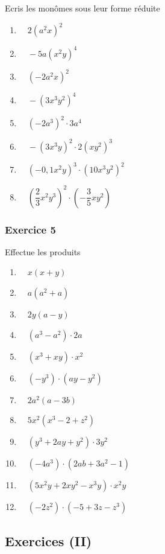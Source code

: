 \documentclass[
  12pt,
]{book}
\providecommand{\tightlist}{%
  \setlength{\itemsep}{0pt}\setlength{\parskip}{0pt}}
\begin{document}
Ecris les monômes sous leur forme réduite

\begin{enumerate}
\def\labelenumi{\arabic{enumi}.}
\tightlist
\item
  \(\quad 2(a^2x)^2\)
\item
  \(\quad -5a(x^2y)^4\)
\item
  \(\quad (-2a^2x)^2\)
\item
  \(\quad -(3x^3y^2)^4\)
\item
  \(\quad (-2a^3)^2\cdot 3a^4\)
\item
  \(\quad -(3x^3y)^2\cdot 2(xy^2)^3\)
\item
  \(\quad (-0{,}1x^2y)^3\cdot(10x^3y^2)^2\)
\item
  \(\quad \left(\dfrac{2}{3}x^2y^3\right)^2\cdot\left(-\dfrac{3}{5}xy^2\right)\)
\end{enumerate}

\hypertarget{exercice-5-2}{%
\subsubsection*{Exercice 5}\label{exercice-5-2}}

Effectue les produits

\begin{enumerate}
\def\labelenumi{\arabic{enumi}.}
\tightlist
\item
  \(\quad x(x+y)\)
\item
  \(\quad a(a^2+a)\)
\item
  \(\quad 2y(a-y)\)
\item
  \(\quad (a^3-a^2)\cdot 2a\)
\item
  \(\quad (x^3+xy)\cdot x^2\)
\item
  \(\quad (-y^3)\cdot(ay-y^2)\)
\item
  \(\quad 2a^2(a-3b)\)
\item
  \(\quad 5x^2(x^3-2+z^2)\)
\item
  \(\quad (y^3+2ay+y^2)\cdot 3y^2\)
\item
  \(\quad (-4a^3)\cdot(2ab+3a^2-1)\)
\item
  \(\quad (5x^2y+2xy^2-x^3y)\cdot x^2y\)
\item
  \(\quad (-2z^2)\cdot(-5+3z-z^3)\)
\end{enumerate}

\hypertarget{exercices-ii-1}{%
\subsection{Exercices (II)}\label{exercices-ii-1}}
\end{document}
